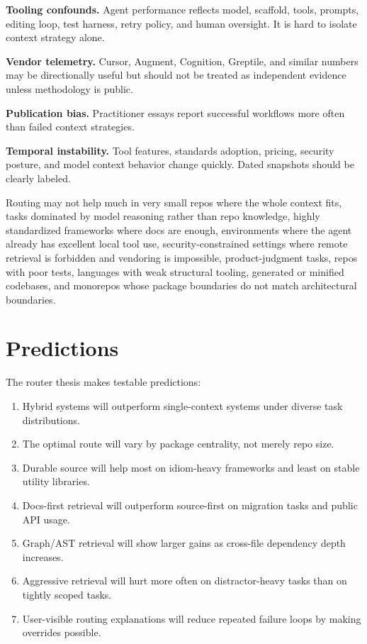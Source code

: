 \documentclass[
  11pt,
  letterpaper,
  numbers=noendperiod,
  parskip=half]{scrartcl}
\providecommand{\tightlist}{%
  \setlength{\itemsep}{0pt}\setlength{\parskip}{0pt}}
\begin{document}
\textbf{Tooling confounds.} Agent performance reflects model, scaffold,
tools, prompts, editing loop, test harness, retry policy, and human
oversight. It is hard to isolate context strategy alone.

\textbf{Vendor telemetry.} Cursor, Augment, Cognition, Greptile, and
similar numbers may be directionally useful but should not be treated as
independent evidence unless methodology is public.

\textbf{Publication bias.} Practitioner essays report successful
workflows more often than failed context strategies.

\textbf{Temporal instability.} Tool features, standards adoption,
pricing, security posture, and model context behavior change quickly.
Dated snapshots should be clearly labeled.

Routing may not help much in very small repos where the whole context
fits, tasks dominated by model reasoning rather than repo knowledge,
highly standardized frameworks where docs are enough, environments where
the agent already has excellent local tool use, security-constrained
settings where remote retrieval is forbidden and vendoring is
impossible, product-judgment tasks, repos with poor tests, languages
with weak structural tooling, generated or minified codebases, and
monorepos whose package boundaries do not match architectural
boundaries.

\section{Predictions}\label{sec-predictions}

The router thesis makes testable predictions:

\begin{enumerate}
\def\labelenumi{\arabic{enumi}.}
\tightlist
\item
  Hybrid systems will outperform single-context systems under diverse
  task distributions.
\item
  The optimal route will vary by package centrality, not merely repo
  size.
\item
  Durable source will help most on idiom-heavy frameworks and least on
  stable utility libraries.
\item
  Docs-first retrieval will outperform source-first on migration tasks
  and public API usage.
\item
  Graph/AST retrieval will show larger gains as cross-file dependency
  depth increases.
\item
  Aggressive retrieval will hurt more often on distractor-heavy tasks
  than on tightly scoped tasks.
\item
  User-visible routing explanations will reduce repeated failure loops
  by making overrides possible.
\end{enumerate}
\end{document}
